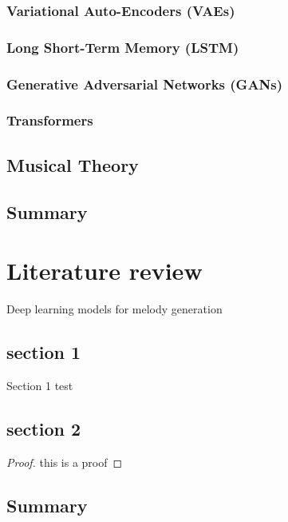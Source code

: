 \documentclass[12pt, a4paper]{report}
\theoremstyle{definition}
\theoremstyle{definition}%
\theoremstyle{definition}%
\theoremstyle{definition}%
\theoremstyle{definition}%
\theoremstyle{definition}%
\begin{document}
		\subsection{Variational Auto-Encoders (VAEs)} 
		
		
		
		\subsection{Long Short-Term Memory (LSTM)} 
		
		\subsection{Generative Adversarial Networks (GANs)}
		
		\subsection{Transformers}
	
	\section{Musical Theory}
	
	\section{Summary}

\chapter{Literature review}

Deep learning models for melody generation

	\section{section 1}
		Section 1 test


	\section{section 2}
		\begin{proof}
		this is a proof
		\end{proof}
		
	\section{Summary}
	
\end{document}

